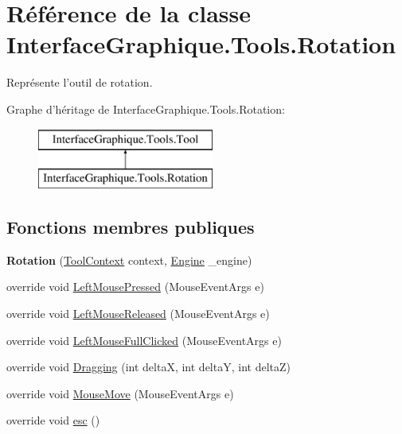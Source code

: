 \hypertarget{class_interface_graphique_1_1_tools_1_1_rotation}{\section{Référence de la classe Interface\-Graphique.\-Tools.\-Rotation}
\label{class_interface_graphique_1_1_tools_1_1_rotation}
}


Représente l'outil de rotation.  


Graphe d'héritage de Interface\-Graphique.\-Tools.\-Rotation\-:\begin{figure}[H]
\begin{center}
\leavevmode
\includegraphics[height=2.000000cm]{class_interface_graphique_1_1_tools_1_1_rotation}
\end{center}
\end{figure}
\subsection*{Fonctions membres publiques}
\begin{DoxyCompactItemize}
\item 
\hypertarget{class_interface_graphique_1_1_tools_1_1_rotation_a36a7d0b95b737892436c39b7704490d4}{{\bfseries Rotation} (\hyperlink{class_interface_graphique_1_1_tools_1_1_tool_context}{Tool\-Context} context, \hyperlink{class_interface_graphique_1_1_engine}{Engine} \-\_\-engine)}\label{class_interface_graphique_1_1_tools_1_1_rotation_a36a7d0b95b737892436c39b7704490d4}

\item 
override void \hyperlink{class_interface_graphique_1_1_tools_1_1_rotation_aade19712f68677d50299f598245bced2}{Left\-Mouse\-Pressed} (Mouse\-Event\-Args e)
\item 
override void \hyperlink{class_interface_graphique_1_1_tools_1_1_rotation_a012cd3e91e09356e2ec1a7914ec83b77}{Left\-Mouse\-Released} (Mouse\-Event\-Args e)
\item 
override void \hyperlink{class_interface_graphique_1_1_tools_1_1_rotation_a6f39a2956e6a6b1d493e1908e08f1fda}{Left\-Mouse\-Full\-Clicked} (Mouse\-Event\-Args e)
\item 
override void \hyperlink{class_interface_graphique_1_1_tools_1_1_rotation_a3ab72aad0c7d78fad3e7544ef67bffd7}{Dragging} (int delta\-X, int delta\-Y, int delta\-Z)
\item 
override void \hyperlink{class_interface_graphique_1_1_tools_1_1_rotation_a756456f57a12c3e9b9606d9b63023f0f}{Mouse\-Move} (Mouse\-Event\-Args e)
\item 
override void \hyperlink{class_interface_graphique_1_1_tools_1_1_rotation_af190de2985cd4d21d334df52df8d48d4}{esc} ()
\end{DoxyCompactItemize}

